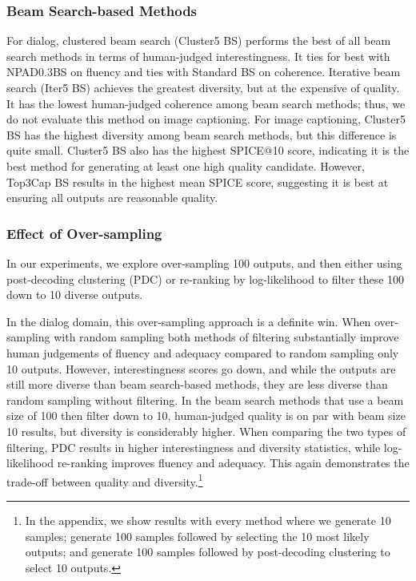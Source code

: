 \documentclass[thesis.tex]{subfiles}
\begin{document}
\subsubsection{Beam Search-based Methods}

For dialog, clustered beam search (Cluster5 BS) performs the best of all beam search methods in terms of human-judged interestingness. It ties for best with NPAD0.3BS on fluency and ties with Standard BS on coherence. Iterative beam search (Iter5 BS) achieves the greatest diversity, but at the expensive of quality. It has the lowest human-judged coherence among beam search methods; thus, we do not evaluate this method on image captioning. For image captioning, Cluster5 BS has the highest diversity among beam search methods, but this difference is quite small. Cluster5 BS also has the highest SPICE@10 score, indicating it is the best method for generating at least one high quality candidate. However, Top3Cap BS results in the highest mean SPICE score, suggesting it is best at ensuring all outputs are reasonable quality.

\subsubsection{Effect of Over-sampling}

In our experiments, we explore over-sampling 100 outputs, and then either using post-decoding clustering (PDC) or re-ranking by log-likelihood to filter these 100 down to 10 diverse outputs.

In the dialog domain, this over-sampling approach is a definite win. When over-sampling with random sampling both methods of filtering substantially improve human judgements of fluency and adequacy compared to random sampling only 10 outputs. However, interestingness scores go down, and while the outputs are still more diverse than beam search-based methods, they are less diverse than random sampling without filtering. In the beam search methods that use a beam size of 100 then filter down to 10, human-judged quality is on par with beam size 10 results, but diversity is considerably higher. When comparing the two types of filtering, PDC results in higher interestingness and diversity statistics, while log-likelihood re-ranking improves fluency and adequacy. This again demonstrates the trade-off between quality and diversity.\footnote{In the appendix, we show results with every method where we generate 10 samples; generate 100 samples followed by selecting the 10 most likely outputs; and generate 100 samples followed by post-decoding clustering to select 10 outputs.}
\end{document}

